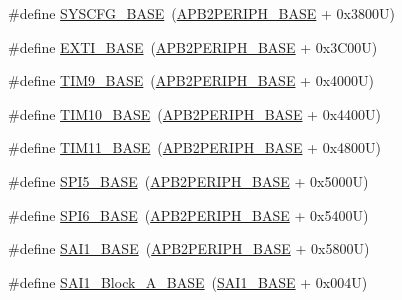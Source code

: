 \begin{DoxyCompactItemize}
\item 
\#define \hyperlink{group___peripheral__memory__map_ga62246020bf3b34b6a4d8d0e84ec79d3d}{S\+Y\+S\+C\+F\+G\+\_\+\+B\+A\+SE}~(\hyperlink{group___peripheral__memory__map_ga25b99d6065f1c8f751e78f43ade652cb}{A\+P\+B2\+P\+E\+R\+I\+P\+H\+\_\+\+B\+A\+SE} + 0x3800\+U)
\item 
\#define \hyperlink{group___peripheral__memory__map_ga87371508b3bcdcd98cd1ec629be29061}{E\+X\+T\+I\+\_\+\+B\+A\+SE}~(\hyperlink{group___peripheral__memory__map_ga25b99d6065f1c8f751e78f43ade652cb}{A\+P\+B2\+P\+E\+R\+I\+P\+H\+\_\+\+B\+A\+SE} + 0x3\+C00\+U)
\item 
\#define \hyperlink{group___peripheral__memory__map_ga92ae902be7902560939223dd765ece08}{T\+I\+M9\+\_\+\+B\+A\+SE}~(\hyperlink{group___peripheral__memory__map_ga25b99d6065f1c8f751e78f43ade652cb}{A\+P\+B2\+P\+E\+R\+I\+P\+H\+\_\+\+B\+A\+SE} + 0x4000\+U)
\item 
\#define \hyperlink{group___peripheral__memory__map_ga3eff32f3801db31fb4b61d5618cad54a}{T\+I\+M10\+\_\+\+B\+A\+SE}~(\hyperlink{group___peripheral__memory__map_ga25b99d6065f1c8f751e78f43ade652cb}{A\+P\+B2\+P\+E\+R\+I\+P\+H\+\_\+\+B\+A\+SE} + 0x4400\+U)
\item 
\#define \hyperlink{group___peripheral__memory__map_ga3a4a06bb84c703084f0509e105ffaf1d}{T\+I\+M11\+\_\+\+B\+A\+SE}~(\hyperlink{group___peripheral__memory__map_ga25b99d6065f1c8f751e78f43ade652cb}{A\+P\+B2\+P\+E\+R\+I\+P\+H\+\_\+\+B\+A\+SE} + 0x4800\+U)
\item 
\#define \hyperlink{group___peripheral__memory__map_gac1c58d33414e167d478ecd0e31331dfa}{S\+P\+I5\+\_\+\+B\+A\+SE}~(\hyperlink{group___peripheral__memory__map_ga25b99d6065f1c8f751e78f43ade652cb}{A\+P\+B2\+P\+E\+R\+I\+P\+H\+\_\+\+B\+A\+SE} + 0x5000\+U)
\item 
\#define \hyperlink{group___peripheral__memory__map_gaf69c602bd348dc0aa1b4e829e40ebb70}{S\+P\+I6\+\_\+\+B\+A\+SE}~(\hyperlink{group___peripheral__memory__map_ga25b99d6065f1c8f751e78f43ade652cb}{A\+P\+B2\+P\+E\+R\+I\+P\+H\+\_\+\+B\+A\+SE} + 0x5400\+U)
\item 
\#define \hyperlink{group___peripheral__memory__map_ga24c1053b754946b512f9c31123e09d21}{S\+A\+I1\+\_\+\+B\+A\+SE}~(\hyperlink{group___peripheral__memory__map_ga25b99d6065f1c8f751e78f43ade652cb}{A\+P\+B2\+P\+E\+R\+I\+P\+H\+\_\+\+B\+A\+SE} + 0x5800\+U)
\item 
\#define \hyperlink{group___peripheral__memory__map_ga31f72e5e5d7aea23bc8a5191bc32e900}{S\+A\+I1\+\_\+\+Block\+\_\+\+A\+\_\+\+B\+A\+SE}~(\hyperlink{group___peripheral__memory__map_ga24c1053b754946b512f9c31123e09d21}{S\+A\+I1\+\_\+\+B\+A\+SE} + 0x004\+U)

\end{DoxyCompactItemize}
